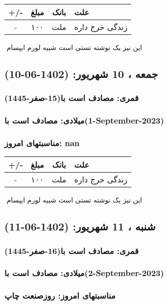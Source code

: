 \documentclass{article}
\newcommand{\rnote}[1]{\marginpar{\textcolor{color}{\StrSubstitute{\##1}{ }{\_}}}}
\newcommand{\myRow}[4]{
    #1 & #2 & #3 & #4 \\ \hline
}
\begin{document}
\begin{tabular}{ | c | c | c | p{5cm} |}
    \hline
    \myRow{ +/- }{مبلغ}{بانک}{علت}
    \myRow{-}{۱۰۰}{ملت}{زندگی خرج داره}
\end{tabular}
\newline
\newline

‌
\rnote{تست}
این نیز یک نوشته تستی است شبیه لورم ایپسام




\newpage
{}
\textcolor{color}{
\section{ جمعه ، 10 شهریور: (1402-06-10) }
\subsubsection*{قمری: مصادف است با(15-صفر-1445)} 
\subsubsection*{میلادی: مصادف است با(1-September-2023)}
\subsubsection*{مناسبتهای امروز: nan}
}


\begin{tabular}{ | c | c | c | p{5cm} |}
    \hline
    \myRow{ +/- }{مبلغ}{بانک}{علت}
    \myRow{-}{۱۰۰}{ملت}{زندگی خرج داره}
\end{tabular}
\newline
\newline

‌
\rnote{تست}
این نیز یک نوشته تستی است شبیه لورم ایپسام




\newpage
{}
\textcolor{color}{
\section{ شنبه ، 11 شهریور: (1402-06-11) }
\subsubsection*{قمری: مصادف است با(16-صفر-1445)} 
\subsubsection*{میلادی: مصادف است با(2-September-2023)}
\subsubsection*{مناسبتهای امروز: روزصنعت چاپ}
}
\end{document}

